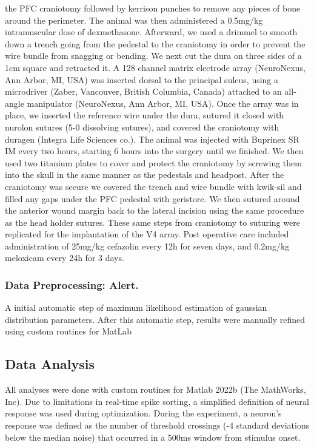 the PFC craniotomy followed by kerrison punches to remove any pieces of bone around the perimeter. The animal was then administered a 0.5mg/kg intramuscular dose of dexmethasone. Afterward, we used a drimmel to smooth down a trench going from the pedestal to the craniotomy in order to prevent the wire bundle from snagging or bending. We next cut the dura on three sides of a 1cm square and retracted it. A 128 channel matrix electrode array (NeuroNexus, Ann Arbor, MI, USA) was inserted dorsal to the principal sulcus, using a microdriver (Zaber, Vancouver, British Columbia, Canada) attached to an all-angle manipulator (NeuroNexus, Ann Arbor, MI, USA). Once the array was in place, we inserted the reference wire under the dura, sutured it closed with nurolon sutures (5-0 dissolving sutures), and covered the craniotomy with duragen (Integra Life Sciences co.). The animal was injected with Buprinex SR IM every two hours, starting 6 hours into the surgery until we finished. We then used two titanium plates to cover and protect the craniotomy by screwing them into the skull in the same manner as the pedestals and headpost. After the craniotomy was secure we covered the trench and wire bundle with kwik-sil and filled any gaps under the PFC pedestal with geristore. We then sutured around the anterior wound margin back to the lateral incision using the same procedure as the head holder sutures. These same steps from craniotomy to suturing were replicated for the implantation of the V4 array. Post operative care included administration of 25mg/kg cefazolin every 12h for seven days, and 0.2mg/kg meloxicam every 24h for 3 days.

\subsubsection*{Data Preprocessing: Alert.}
A initial automatic step of maximum likelihood estimation of gaussian distribution parameters. After this automatic step, results were manually refined using custom routines for MatLab \parencite{Kelly2007}


\subsection*{Data Analysis}
All analyses were done with custom routines for Matlab 2022b (The MathWorks, Inc). Due to limitations in real-time spike sorting, a simplified definition of neural response was used during optimization. During the experiment, a neuron's response was defined as the number of threshold crossings (-4 standard deviations below the median noise) that occurred in a 500ms window from stimulus onset. 


